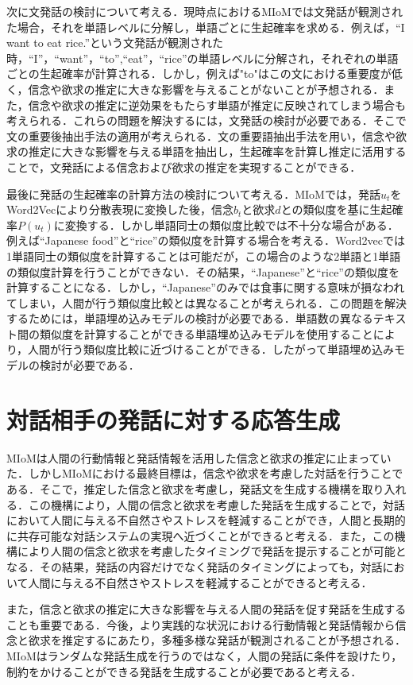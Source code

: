 \par
次に文発話の検討について考える．現時点におけるMIoMでは文発話が観測された場合，それを単語レベルに分解し，単語ごとに生起確率を求める．例えば，``I want to eat rice.''という文発話が観測された時，``I''，``want''，``to'',``eat''，``rice''の単語レベルに分解され，それぞれの単語ごとの生起確率が計算される．しかし，例えば"to"はこの文における重要度が低く，信念や欲求の推定に大きな影響を与えることがないことが予想される．また，信念や欲求の推定に逆効果をもたらす単語が推定に反映されてしまう場合も考えられる．これらの問題を解決するには，文発話の検討が必要である．そこで文の重要後抽出手法の適用が考えられる．文の重要語抽出手法を用い，信念や欲求の推定に大きな影響を与える単語を抽出し，生起確率を計算し推定に活用することで，文発話による信念および欲求の推定を実現することができる．

\par
最後に発話の生起確率の計算方法の検討について考える．MIoMでは，発話$u_t$をWord2Vecにより分散表現に変換した後，信念$b_t$と欲求$d$との類似度を基に生起確率$P(u_t)$に変換する．しかし単語同士の類似度比較では不十分な場合がある．例えば``Japanese food''と``rice''の類似度を計算する場合を考える．Word2vecでは1単語同士の類似度を計算することは可能だが，この場合のような2単語と1単語の類似度計算を行うことができない．その結果，``Japanese''と``rice''の類似度を計算することになる．しかし，``Japanese''のみでは食事に関する意味が損なわれてしまい，人間が行う類似度比較とは異なることが考えられる．この問題を解決するためには，単語埋め込みモデルの検討が必要である．単語数の異なるテキスト間の類似度を計算することができる単語埋め込みモデルを使用することにより，人間が行う類似度比較に近づけることができる．したがって単語埋め込みモデルの検討が必要である．


\section{対話相手の発話に対する応答生成}

\par
MIoMは人間の行動情報と発話情報を活用した信念と欲求の推定に止まっていた．しかしMIoMにおける最終目標は，信念や欲求を考慮した対話を行うことである．そこで，推定した信念と欲求を考慮し，発話文を生成する機構を取り入れる．この機構により，人間の信念と欲求を考慮した発話を生成することで，対話において人間に与える不自然さやストレスを軽減することができ，人間と長期的に共存可能な対話システムの実現へ近づくことができると考える．また，この機構により人間の信念と欲求を考慮したタイミングで発話を提示することが可能となる．その結果，発話の内容だけでなく発話のタイミングによっても，対話において人間に与える不自然さやストレスを軽減することができると考える．

\par
また，信念と欲求の推定に大きな影響を与える人間の発話を促す発話を生成することも重要である．今後，より実践的な状況における行動情報と発話情報から信念と欲求を推定するにあたり，多種多様な発話が観測されることが予想される．MIoMはランダムな発話生成を行うのではなく，人間の発話に条件を設けたり，制約をかけることができる発話を生成することが必要であると考える．
